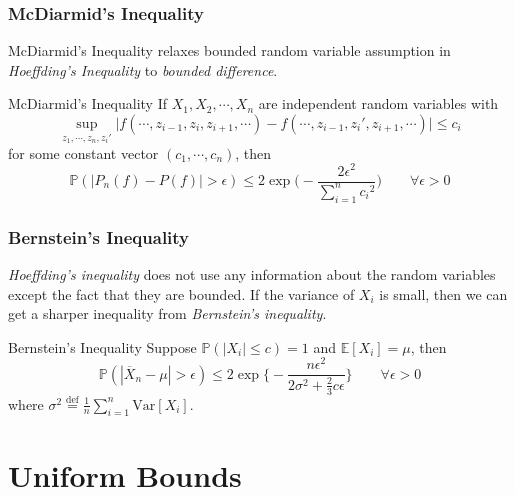 \documentclass{beamer}
\begin{document}

\begin{frame}
\frametitle{McDiarmid's Inequality} 

McDiarmid's Inequality relaxes bounded random variable assumption in \textit{Hoeffding's Inequality} to \textit{bounded difference}. 
\begin{block}{McDiarmid's Inequality}
If $X_1, X_2, \cdots, X_n$ are independent random variables with 
$$ \sup_{z_1, \cdots, z_n, {z_i}'} \bigg\lvert f(\cdots, z_{i-1}, z_i, z_{i+1}, \cdots) - f(\cdots, z_{i-1}, {z_i}', z_{i+1}, \cdots) \bigg\rvert \leq c_i $$
for some constant vector $(c_1, \cdots, c_n)$, then 
$$ \mathbb{P}(|P_n(f) - P(f)| > \epsilon) \leq 2 \exp \bigg( -\frac{2\epsilon^2}{\sum_{i=1}^{n} {c_i}^2} \bigg) \qquad \forall \epsilon > 0 $$
\end{block}

\end{frame}


\begin{frame}
\frametitle{Bernstein's Inequality} 

\textit{Hoeffding’s inequality} does not use any information about the random variables except the fact that they are bounded. If the variance of $X_i$ is small, then we can get a sharper inequality from \textit{Bernstein’s inequality}.
\begin{block}{Bernstein’s Inequality}
Suppose $\mathbb{P}(|X_i| \leq c) = 1$ and $\mathbb{E}[X_i] = \mu$, then 
$$ \mathbb{P}(|\overline{X}_n - \mu| > \epsilon) \leq 2 \exp \bigg\{ - \frac{n\epsilon^2}{2\sigma^2 + \frac{2}{3}c\epsilon} \bigg\} \qquad \forall \epsilon > 0 $$
where $\sigma^2 \stackrel{\text{def}}{=} \frac{1}{n}\sum_{i=1}^{n} \text{Var}[X_i]$. 
\end{block}

\end{frame}

\section{Uniform Bounds} 
\end{document}
